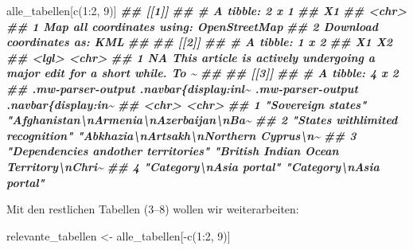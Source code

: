 \documentclass[
  ngerman,
]{article}
\newenvironment{Shaded}{\begin{snugshade}}{\end{snugshade}}
\newcommand{\DecValTok}[1]{\textcolor[rgb]{0.00,0.00,0.81}{#1}}
\newcommand{\DocumentationTok}[1]{\textcolor[rgb]{0.56,0.35,0.01}{\textbf{\textit{#1}}}}
\newcommand{\FunctionTok}[1]{\textcolor[rgb]{0.00,0.00,0.00}{#1}}
\newcommand{\NormalTok}[1]{#1}
\newcommand{\OtherTok}[1]{\textcolor[rgb]{0.56,0.35,0.01}{#1}}
\newcommand{\SpecialCharTok}[1]{\textcolor[rgb]{0.00,0.00,0.00}{#1}}
\begin{document}
\begin{Shaded}
\begin{Highlighting}[]
\NormalTok{alle\_tabellen[}\FunctionTok{c}\NormalTok{(}\DecValTok{1}\SpecialCharTok{:}\DecValTok{2}\NormalTok{, }\DecValTok{9}\NormalTok{)]}
\DocumentationTok{\#\# [[1]]}
\DocumentationTok{\#\# \# A tibble: 2 x 1}
\DocumentationTok{\#\#   X1                                      }
\DocumentationTok{\#\#   \textless{}chr\textgreater{}                                   }
\DocumentationTok{\#\# 1 Map all coordinates using: OpenStreetMap}
\DocumentationTok{\#\# 2 Download coordinates as: KML            }
\DocumentationTok{\#\# }
\DocumentationTok{\#\# [[2]]}
\DocumentationTok{\#\# \# A tibble: 1 x 2}
\DocumentationTok{\#\#   X1    X2                                                                      }
\DocumentationTok{\#\#   \textless{}lgl\textgreater{} \textless{}chr\textgreater{}                                                                   }
\DocumentationTok{\#\# 1 NA    This article is actively undergoing a major edit for a short while. To \textasciitilde{}}
\DocumentationTok{\#\# }
\DocumentationTok{\#\# [[3]]}
\DocumentationTok{\#\# \# A tibble: 4 x 2}
\DocumentationTok{\#\#   \textasciigrave{}.mw{-}parser{-}output .navbar\{display:inl\textasciitilde{} \textasciigrave{}.mw{-}parser{-}output .navbar\{display:in\textasciitilde{}}
\DocumentationTok{\#\#   \textless{}chr\textgreater{}                                   \textless{}chr\textgreater{}                                 }
\DocumentationTok{\#\# 1 "Sovereign states"                      "Afghanistan\textbackslash{}nArmenia\textbackslash{}nAzerbaijan\textbackslash{}nBa\textasciitilde{}}
\DocumentationTok{\#\# 2 "States withlimited recognition"        "Abkhazia\textbackslash{}nArtsakh\textbackslash{}nNorthern Cyprus\textbackslash{}n\textasciitilde{}}
\DocumentationTok{\#\# 3 "Dependencies andother territories"     "British Indian Ocean Territory\textbackslash{}nChri\textasciitilde{}}
\DocumentationTok{\#\# 4 "Category\textbackslash{}nAsia portal"                 "Category\textbackslash{}nAsia portal"}
\end{Highlighting}
\end{Shaded}

Mit den restlichen Tabellen (3--8) wollen wir weiterarbeiten:

\begin{Shaded}
\begin{Highlighting}[]
\NormalTok{relevante\_tabellen }\OtherTok{\textless{}{-}}\NormalTok{ alle\_tabellen[}\SpecialCharTok{{-}}\FunctionTok{c}\NormalTok{(}\DecValTok{1}\SpecialCharTok{:}\DecValTok{2}\NormalTok{, }\DecValTok{9}\NormalTok{)]}
\end{Highlighting}
\end{Shaded}
\end{document}
